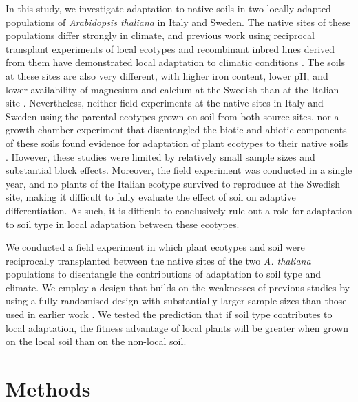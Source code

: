 \documentclass[twocolumn,twoside,lettersize]{article}
\begin{document}
In this study, we investigate adaptation to native soils in two locally adapted populations of \textit{Arabidopsis thaliana} in Italy and Sweden. The native sites of these populations differ strongly in climate, and previous work using reciprocal transplant experiments of local ecotypes and recombinant inbred lines derived from them have demonstrated local adaptation to climatic conditions \cite{Agren2012-ga, Agren2013-ph, Postma2016-jj, Oakley2014-td, Lee2024-up}. The soils at these sites are also very different, with higher iron content, lower pH, and lower availability of magnesium and calcium at the Swedish than at the Italian site \cite{Thiergart2020-rh}. Nevertheless, neither field experiments at the native sites in Italy and Sweden using the parental ecotypes grown on soil from both source sites, nor a growth-chamber experiment that disentangled the biotic and abiotic components of these soils found evidence for adaptation of plant ecotypes to their native soils \cite{Thiergart2020-rh, Duran2022-ha}. However, these studies were limited by relatively small sample sizes and substantial block effects. Moreover, the field experiment was conducted in a single year, and no plants of the Italian ecotype survived to reproduce at the Swedish site, making it difficult to fully evaluate the effect of soil on adaptive differentiation. As such, it is difficult to conclusively rule out a role for adaptation to soil type in local adaptation between these ecotypes.

We conducted a field experiment in which plant ecotypes and soil were reciprocally transplanted between the native sites of the two \textit{A. thaliana} populations to disentangle the contributions of adaptation to soil type and climate. We employ a design that builds on the weaknesses of previous studies by using a fully randomised design with substantially larger sample sizes than those used in earlier work \cite{Thiergart2020-rh, Duran2022-ha}. We tested the prediction that if soil type contributes to local adaptation, the fitness advantage of local plants will be greater when grown on the local soil than on the non-local soil.

\section*{Methods}
\end{document}
